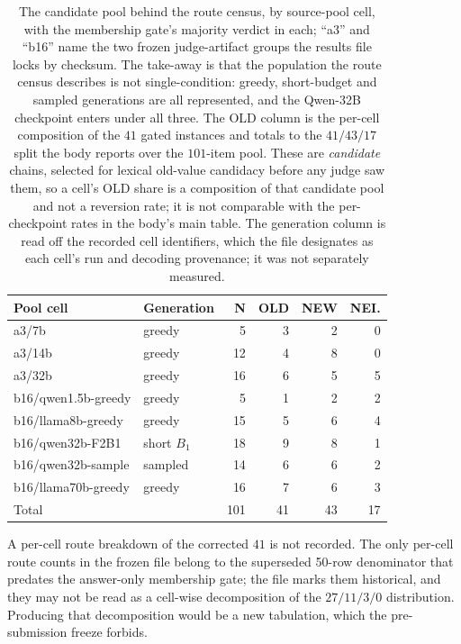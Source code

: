 \documentclass[letterpaper]{article}
\begin{document}
\begin{table}[t]
\centering
\small
\begin{tabular}{llrrrr}
\toprule
Pool cell & Generation &  N & OLD & NEW & NEI. \\
\midrule
a3/7b                & greedy      &   5 &  3 &  2 &  0 \\
a3/14b               & greedy      &  12 &  4 &  8 &  0 \\
a3/32b               & greedy      &  16 &  6 &  5 &  5 \\
b16/qwen1.5b-greedy  & greedy      &   5 &  1 &  2 &  2 \\
b16/llama8b-greedy   & greedy      &  15 &  5 &  6 &  4 \\
b16/qwen32b-F2B1     & short \(B_1\) &  18 &  9 &  8 &  1 \\
b16/qwen32b-sample   & sampled     &  14 &  6 &  6 &  2 \\
b16/llama70b-greedy  & greedy      &  16 &  7 &  6 &  3 \\
\midrule
Total                &             & 101 & 41 & 43 & 17 \\
\bottomrule
\end{tabular}
\caption{The candidate pool behind the route census, by source-pool cell, with the
membership gate's majority verdict in each; ``a3'' and ``b16'' name the
two frozen judge-artifact groups the results file locks by checksum.  The
take-away is that the population the route census describes is not
single-condition: greedy, short-budget and sampled generations are all
represented, and the Qwen-32B checkpoint enters under all three.  The OLD column
is the per-cell composition of the \(41\) gated instances and totals to the
\(41/43/17\) split the body reports over the \(101\)-item pool.  These are
\emph{candidate} chains, selected for lexical old-value candidacy before any
judge saw them, so a cell's OLD share is a composition of that candidate pool and
not a reversion rate; it is not comparable with the per-checkpoint rates in the
body's main table.  The generation column is read off the recorded cell
identifiers, which the file designates as each cell's run and decoding
provenance; it was not separately measured.}
\label{tab:s2c-pool}
\end{table}

A per-cell route breakdown of the corrected \(41\) is not recorded.  The only
per-cell route counts in the frozen file belong to the superseded 50-row
denominator that predates the answer-only membership gate; the file marks them
historical, and they may not be read as a cell-wise decomposition of the
\(27/11/3/0\) distribution.  Producing that decomposition would be a new
tabulation, which the pre-submission freeze forbids.
\end{document}
